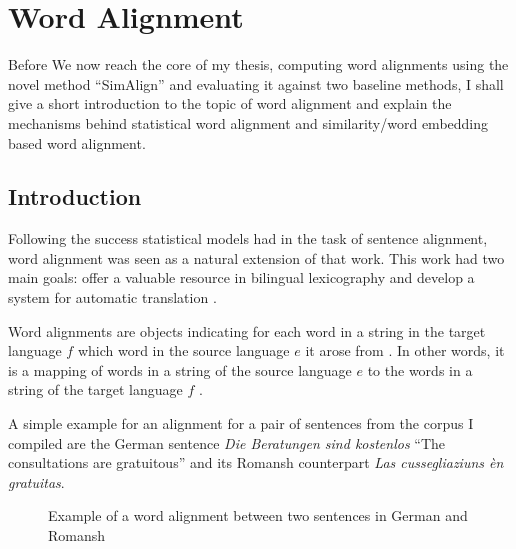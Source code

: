 \chapter{Word Alignment}\label{chap:word-alignment}

Before We now reach the core of my thesis, computing word alignments using the novel method \enquote{SimAlign} \autocite{jalili-sabet-etal-2020-simalign} and evaluating it against two baseline methods, I shall give a short introduction to the topic of word alignment and explain the mechanisms behind statistical word alignment and  similarity/word embedding based word alignment.

\section{Introduction}
Following the success statistical models had in the task of sentence alignment, word alignment was seen as a natural extension of that work. 
This work had two main goals: offer a valuable resource in bilingual lexicography and develop a system for automatic translation \autocite{brown-etal-1993-mathematics}. 

Word alignments are objects indicating for each word in a string in the target language \(f\) which word in the source language \(e\) it arose from \autocite{brown-etal-1993-mathematics}. 
In other words, it is a mapping of words in a string of the source language \(e\) to the words in a string of the target language \(f\) \autocite[84]{koehn2009}.

A simple example for an alignment for a pair of sentences from the corpus I compiled are the German sentence \emph{Die Beratungen sind kostenlos} \enquote{The consultations are gratuitous} and its Romansh counterpart \emph{Las cussegliaziuns èn gratuitas}. 


\begin{figure}[h]
\centering

    

\vspace*{1cm}

   
\caption[Word alignment example]{Example of a word alignment between two sentences in German and Romansh}
\end{figure}


